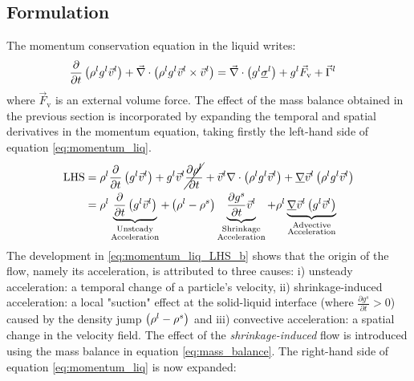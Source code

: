\subsection{Formulation}
The momentum conservation equation in the liquid writes:
\begin{align}
\label{eq:momentum_liq}
& \frac{\partial}{\partial t} \left( \rho^l g^l \vec{v}^l  \right)  + \vec{\nabla} \cdot \left( \rho^l g^l \vec{v}^l \times \vec{v}^l \right) = 
	\vec{\nabla} \cdot \left( g^l \underline{\sigma}^l \right) + g^l \vec{F}_\text{v} + \vec{\Gamma}^{l}
\end{align}
where $\vec{F}_\text{v}$ is an external volume force. The effect of the mass balance obtained in the previous section 
is incorporated by expanding the temporal and spatial derivatives in the momentum equation, taking firstly the left-hand side of equation \eqref{eq:momentum_liq}.
\begin{subequations}
\begin{align}
\label{eq:momentum_liq_LHS_a}
	 \text{LHS} &=
	 \rho^l \frac{\partial}{\partial t} \left(  {g^l} \vec{v}^l  \right)  + {g^l} \vec{v}^l \cancel{\frac{\partial \rho^l}{\partial t}} 
	+ \vec{v}^l \nabla \cdot \left(  \rho^l {g^l} \vec{v}^l  \right) 
	+ \underline{\nabla} \vec{v}^l \left(  \rho^l g^l \vec{v}^l  \right) \\
\label{eq:momentum_liq_LHS_b}
	&= \rho^l \underbrace{ \frac{\partial}{\partial t} \left(  g^l \vec{v}^l  \right)  }_{\substack{\text{Unsteady} \\ \text{Acceleration}}}
	 + \left(  \rho^l - \rho^s  \right) \underbrace{ \frac{\partial  {g^s} }{\partial t} \vec{v}^l}
	    _{\substack{\text{Shrinkage}\\ \text{Acceleration}}}
	+ \rho^l  \underbrace{ \underline{\nabla} \vec{v}^l \left(  {g^l} \vec{v}^l  \right)}_{\substack{\text{Advective} \\ \text{Acceleration}}}     
\end{align}
\end{subequations}
The development in \eqref{eq:momentum_liq_LHS_b} shows that the origin of the flow, namely its acceleration, is 
attributed to three causes: 
 i) unsteady acceleration: a temporal change of a particle's velocity, ii) shrinkage-induced acceleration: a local "suction" effect at the solid-liquid interface (where $\frac{\partial  g^s }{\partial t} >0$) caused by the density jump $\left(  \rho^l - \rho^s  \right)$
and iii) convective acceleration: a spatial change in the velocity field.
The effect of the \emph{shrinkage-induced} flow is introduced using the mass balance in equation \eqref{eq:mass_balance}. The right-hand side of equation \eqref{eq:momentum_liq} is now expanded:
